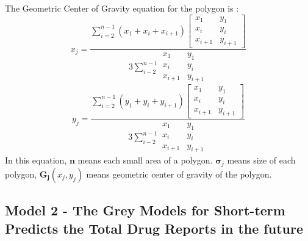 \documentclass{mcmthesis}
\begin{document}
\begin{itemize}
The Geometric Center of Gravity equation for the polygon is :\\
\begin{equation}
{x_j} = \frac{{\sum\limits_{i = 2}^{n - 1} {({x_1} + {x_i} + {x_{i + 1}})\left[ {\begin{array}{*{20}{c}}
				{{x_1}}&{{y_1}}\\
				{{x_i}}&{{y_i}}\\
				{{x_{i + 1}}}&{{y_{i + 1}}}
				\end{array}} \right]} }}{{3\sum\limits_{i - 2}^{n - 1} {\begin{array}{*{20}{c}}
			{{x_1}}&{{y_1}}\\
			{{x_i}}&{{y_i}}\\
			{{x_{i + 1}}}&{{y_{i + 1}}}
			\end{array}} }}
\end{equation}
\begin{equation}
 {y_j} = \frac{{\sum\limits_{i = 2}^{n - 1} {({y_1} + {y_i} + {y_{i + 1}})\left[ {\begin{array}{*{20}{c}}
 				{{x_1}}&{{y_1}}\\
 				{{x_i}}&{{y_i}}\\
 				{{x_{i + 1}}}&{{y_{i + 1}}}
 				\end{array}} \right]} }}{{3\sum\limits_{i - 2}^{n - 1} {\begin{array}{*{20}{c}}
 			{{x_1}}&{{y_1}}\\
 			{{x_i}}&{{y_i}}\\
 			{{x_{i + 1}}}&{{y_{i + 1}}}
 			\end{array}} }}
\end{equation}
In this equation,
$\bm n$ means each small area of a polygon. $\bm \sigma_j $ means size of each polygon, $\bm {G_j}({x_j},{y_j})$ means geometric center of gravity of the polygon. \\
 \end{itemize}

\subsection{Model 2 - The Grey Models for Short-term Predicts the Total Drug Reports in the future } %
\end{document}
